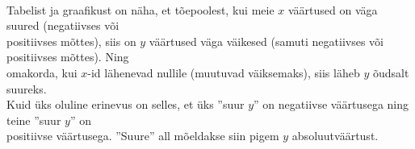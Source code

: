 \begin{center}
{{{\begin{flushleft}
\begin{center}
    \label{pöördvõrd}
\end{center}\\
\vspace{5mm}
\hspace{5mm}
Tabelist ja graafikust on näha, et tõepoolest, kui meie $x$ väärtused on väga suured (negatiivses või\\ \hspace{5mm} positiivses mõttes), siis on $y$ väärtused väga väikesed (samuti negatiivses või positiivses mõttes). Ning\\ \hspace{5mm} omakorda, kui $x$-id lähenevad nullile (muutuvad väiksemaks), siis läheb $y$ õudsalt suureks.\\
\hspace{5mm} Kuid üks oluline erinevus on selles, et üks ''suur $y$'' on negatiivse väärtusega ning teine ''suur $y$'' on\\ \hspace{5mm} positiivse väärtusega. ''Suure'' all mõeldakse siin pigem $y$ absoluutväärtust.

\end{flushleft} 
}}}
\end{center}